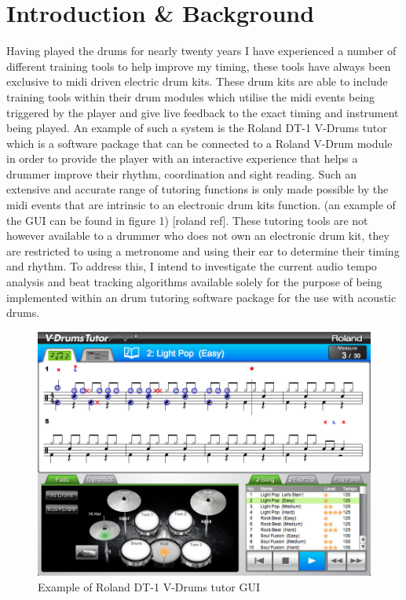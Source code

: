 \documentclass[a4paper, 11pt]{article}
\begin{document}
 

\maketitle
\newpage
\tableofcontents
\clearpage

\maketitle{} \section{Introduction \& Background}
Having played the drums for nearly twenty years I have experienced a number of different training tools to help improve my timing, these tools have always been exclusive to midi driven electric drum kits. These drum kits are able to include training tools within their drum modules which utilise the midi events being triggered by the player and give live feedback to the exact timing and instrument being played. An example of such a system is the Roland DT-1 V-Drums tutor which is a software package that can be connected to a Roland V-Drum module in order to provide the player with an interactive experience that helps a drummer improve their rhythm, coordination and sight reading. Such an extensive and accurate range of tutoring functions is only made possible by the midi events that are intrinsic to an electronic drum kits function. (an example of the GUI can be found in figure 1) [roland ref]. These tutoring tools are not however available to a drummer who does not own an electronic drum kit, they are restricted to using a metronome and using their ear to determine their timing and rhythm. To address this, I intend to investigate the current audio tempo analysis and beat tracking algorithms available solely for the purpose of being implemented within an drum tutoring software package for the use with acoustic drums.
\begin{figure}[h]
\caption{Example of Roland DT-1 V-Drums tutor GUI}
	\centering
	\includegraphics[scale=0.25]{dt-1_ss_main_notation_gal}
\end{figure}
\end{document}
